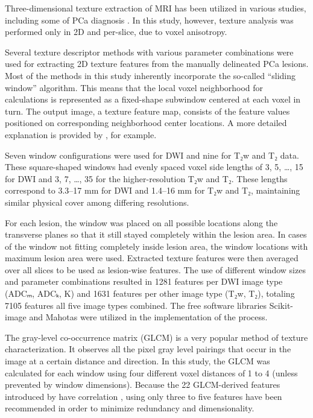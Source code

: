Three-dimensional texture extraction of MRI has been utilized in various
studies, including some of PCa diagnosis \citep{Depeursinge2014}. In this study,
however, texture analysis was performed only in 2D and per-slice, due to voxel
anisotropy.

Several texture descriptor methods with various parameter combinations were used
for extracting 2D texture features from the manually delineated PCa lesions.
Most of the methods in this study inherently incorporate the so-called ``sliding
window'' algorithm. This means that the local voxel neighborhood for
calculations is represented as a fixed-shape subwindow centered at each voxel in
turn. The output image, a texture feature map, consists of the feature values
positioned on corresponding neighborhood center locations. A more detailed
explanation is provided by \citet{Clausi2002Rapid}, for example.

Seven window configurations were used for DWI and nine for T₂w and T₂
data. These square-shaped windows had evenly spaced voxel side lengths of 3, 5,
…, 15 for DWI and 3, 7, …, 35 for the higher-resolution T₂w and T₂. These
lengths correspond to 3.3--17 mm for DWI and 1.4--16 mm for T₂w and T₂,
maintaining similar physical cover among differing resolutions.

For each lesion, the window was placed on all possible locations along the
transverse planes so that it still stayed completely within the lesion area. In
cases of the window not fitting completely inside lesion area, the window
locations with maximum lesion area were used. Extracted texture features were
then averaged over all slices to be used as lesion-wise features. The use of
different window sizes and parameter combinations resulted in 1281 features per
DWI image type (ADCₘ, ADCₖ, K) and 1631 features per other image type (T₂w,
T₂), totaling 7105 features all five image types combined. The free software
libraries Scikit-image \citep{VanderWalt2014} and Mahotas \citep{Coelho2013}
were utilized in the implementation of the process.

The gray-level co-occurrence matrix (GLCM) \citep{Haralick1973} is a very
popular method of texture characterization. It observes all the pixel gray level
pairings that occur in the image at a certain distance and direction. In this
study, the GLCM was calculated for each window using four different voxel
distances of 1 to 4 (unless prevented by window dimensions). Because the 22
GLCM-derived features introduced by \citet{Haralick1973} have correlation
\citep{Albregtsen2008}, using only three to five features have been recommended
\citep{Clausi2002Analysis, Albregtsen2008, Gebejes2013a} in order to minimize
redundancy and dimensionality.

